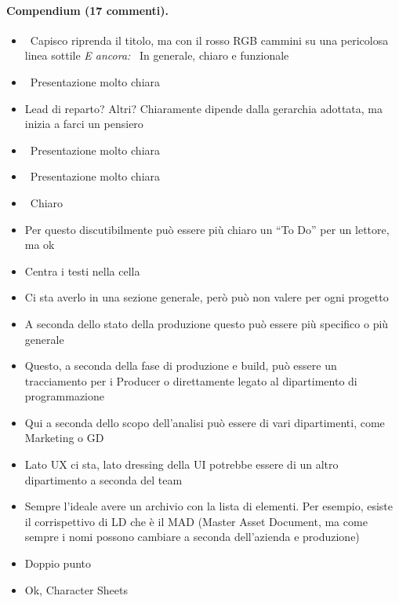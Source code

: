\paragraph{Compendium (17 commenti).}
{\small
\begin{itemize}
  \item {} \rvAvviso\ Capisco riprenda il titolo, ma con il rosso RGB cammini su una pericolosa linea sottile \emph{E ancora:} \rvBene\ In generale, chiaro e funzionale
  \item {} \rvBene\ Presentazione molto chiara
  \item {} Lead di reparto? Altri? Chiaramente dipende dalla gerarchia adottata, ma inizia a farci un pensiero
  \item {} \rvBene\ Presentazione molto chiara
  \item {} \rvBene\ Presentazione molto chiara
  \item {} \rvBene\ Chiaro
  \item {} Per questo discutibilmente può essere più chiaro un ``To Do'' per un lettore, ma ok
  \item {} Centra i testi nella cella
  \item {} Ci sta averlo in una sezione generale, però può non valere per ogni progetto
  \item {} A seconda dello stato della produzione questo può essere più specifico o più generale
  \item {} Questo, a seconda della fase di produzione e build, può essere un tracciamento per i Producer o direttamente legato al dipartimento di programmazione
  \item {} Qui a seconda dello scopo dell'analisi può essere di vari dipartimenti, come Marketing o GD
  \item {} Lato UX ci sta, lato dressing della UI potrebbe essere di un altro dipartimento a seconda del team
  \item {} Sempre l'ideale avere un archivio con la lista di elementi. Per esempio, esiste il corrispettivo di LD che è il MAD (Master Asset Document, ma come sempre i nomi possono cambiare a seconda dell'azienda e produzione)
  \item {} Doppio punto
  \item {} Ok, Character Sheets
\end{itemize}
}

